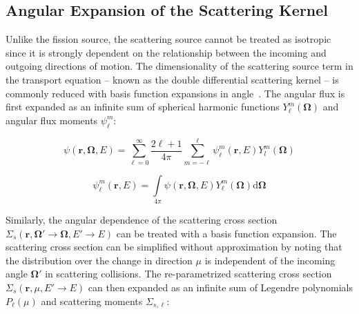 




\subsection{Angular Expansion of the Scattering Kernel}
\label{subsec:chap2-scatt-src}

Unlike the fission source, the scattering source cannot be treated as isotropic since it is strongly dependent on the relationship between the incoming and outgoing directions of motion. The dimensionality of the scattering source term in the transport equation -- known as the double differential scattering kernel -- is commonly reduced with basis function expansions in angle~\cite{hebert2009applied, cacuci2010handbook}. The angular flux is first expanded as an infinite sum of spherical harmonic functions $Y_{\ell}^{m}(\mathbf{\Omega})$ and angular flux moments $\psi_{\ell}^{m}$:

\begin{dmath}
\label{eqn:chap2-flux-expand}
\psi(\mathbf{r},\mathbf{\Omega},E) = \displaystyle\sum\limits_{\ell=0}^{\infty} \frac{2\ell+1}{4\pi} \displaystyle\sum\limits_{m=-\ell}^{\ell} \psi_{\ell}^{m}(\mathbf{r},E)Y_{l}^{m}(\mathbf{\Omega})
\end{dmath}

\begin{dmath}
\label{eqn:chap2-flux-moment}
\psi_{\ell}^{m}(\mathbf{r},E) = \displaystyle\int\limits_{4\pi} \psi(\mathbf{r},\mathbf{\Omega},E)Y_{\ell}^{m}(\mathbf{\Omega}) \mathrm{d}\mathbf{\Omega}
\end{dmath}

Similarly, the angular dependence of the scattering cross section $\Sigma_{s}(\mathbf{r},{\mathbf{\Omega'}\rightarrow\mathbf{\Omega}},{E'\rightarrow E})$ can be treated with a basis function expansion. The scattering cross section can be simplified without approximation by noting that the distribution over the change in direction $\mu$ is independent of the incoming angle $\mathbf{\Omega'}$ in scattering collisions. The re-parametrized scattering cross section $\Sigma_{s}(\mathbf{r},\mu,E'\rightarrow E)$ can then expanded as an infinite sum of Legendre polynomials $P_{\ell}(\mu)$ and scattering moments $\Sigma_{s,\ell}$:

